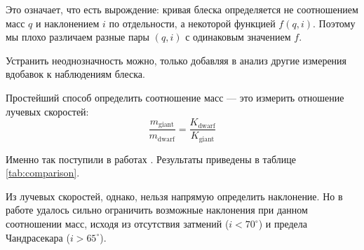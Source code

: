 

Это означает, что есть вырождение: кривая блеска определяется не соотношением масс $q$ и наклонением $i$ по отдельности, а некоторой функцией $f(q,i)$. Поэтому мы плохо различаем разные пары $(q,i)$ с одинаковым значением $f$.

Устранить неоднозначность можно, только добавляя в анализ другие измерения вдобавок к наблюдениям блеска.





Простейший способ определить соотношение масс --- это измерить отношение лучевых скоростей:
\[
\frac{m_\text{giant}}{m_\text{dwarf}} = \frac{K_\text{dwarf}}{K_\text{giant}}
\]

Именно так поступили в работах \cite{Kraft, H_alpha}. Результаты приведены в таблице \ref{tab:comparison}.

Из лучевых скоростей, однако, нельзя напрямую определить наклонение. Но в работе \cite{H_alpha} удалось сильно ограничить возможные наклонения при данном соотношении масс, исходя из отсутствия затмений ($i < 70^\circ$) и предела Чандрасекара ($i > 65^\circ$).


